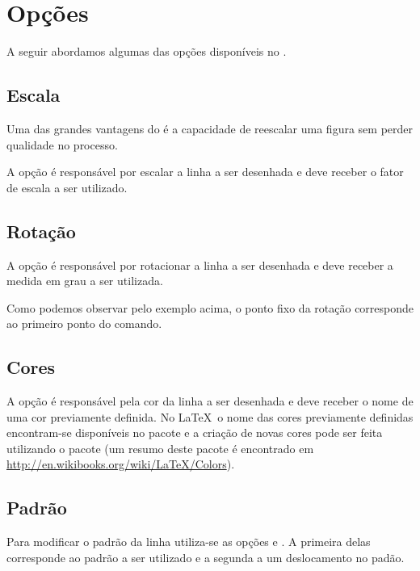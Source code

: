 \section{Op\c{c}\~{o}es}
A seguir abordamos algumas das op\c{c}\~{o}es dispon\'{i}veis no \TikZ.

\subsection{Escala}
Uma das grandes vantagens do \TikZ \'{e} a capacidade de reescalar uma figura sem perder qualidade no processo.

A op\c{c}\~{a}o  \'{e} respons\'{a}vel por escalar a linha a ser desenhada e deve receber o fator de escala a ser utilizado.


\subsection{Rota\c{c}\~{a}o}
A op\c{c}\~{a}o  \'{e} respons\'{a}vel por rotacionar a linha a ser desenhada e deve receber a medida em grau a ser utilizada.


Como podemos observar pelo exemplo acima, o ponto fixo da rota\c{c}\~{a}o corresponde ao primeiro ponto do comando.

\subsection{Cores}
A op\c{c}\~{a}o  \'{e} respons\'{a}vel pela cor da linha a ser desenhada e deve receber o nome de uma cor previamente definida. No \LaTeX \, o nome das cores previamente definidas encontram-se dispon\'{i}veis no pacote  e a cria\c{c}\~{a}o de novas cores pode ser feita utilizando o pacote  (um resumo deste pacote \'{e} encontrado em \url{http://en.wikibooks.org/wiki/LaTeX/Colors}).


\subsection{Padr\~{a}o}
Para modificar o padr\~{a}o da linha utiliza-se as op\c{c}\~{o}es  e . A primeira delas corresponde ao padr\~{a}o a ser utilizado e a segunda a um deslocamento no pad\~{a}o.

